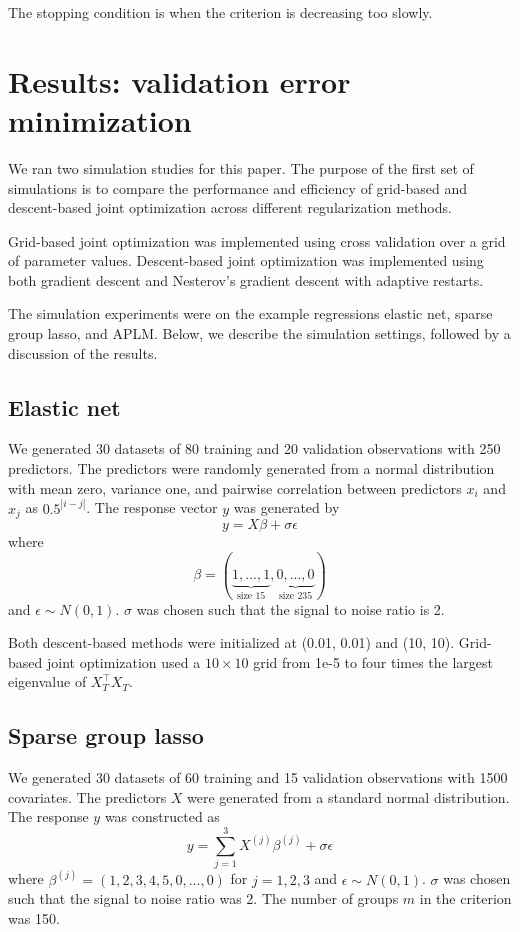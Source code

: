 \documentclass[10pt,letterpaper]{article}
\begin{document}
The stopping condition is when the criterion is decreasing too slowly.

\section{Results: validation error minimization}

We ran two simulation studies for this paper. The purpose of the first set of simulations is to compare the performance and efficiency of grid-based and descent-based joint optimization across different regularization methods.

Grid-based joint optimization was implemented using cross validation over a grid of parameter values. Descent-based joint optimization was implemented using both gradient descent and Nesterov's gradient descent with adaptive restarts.

The simulation experiments were on the example regressions elastic net, sparse group lasso, and APLM.  Below, we describe the simulation settings, followed by a discussion of the results.

\subsection{Elastic net}
We generated 30 datasets of 80 training and 20 validation observations with 250 predictors. The predictors were randomly generated from a normal distribution with mean zero, variance one, and pairwise correlation between predictors $x_i$ and $x_j$ as $0.5^{|i-j|}$.
The response vector $y$ was generated by
\begin{equation}
y = X\beta + \sigma \epsilon
\end{equation}
where
\begin{equation}
\beta = (\underbrace{1, ..., 1}_\text{size 15}, \underbrace{0, ..., 0}_\text{size 235})
\end{equation}
and $\epsilon \sim N(0, 1)$. $\sigma$ was chosen such that the signal to noise ratio is 2. 

Both descent-based methods were initialized at (0.01, 0.01) and (10, 10). Grid-based joint optimization used a $10 \times 10$ grid from 1e-5 to four times the largest eigenvalue of $X_T^\top X_T$.

\subsection{Sparse group lasso}

We generated 30 datasets of 60 training and 15 validation observations with 1500 covariates. The predictors $X$ were generated from a standard normal distribution. The response $y$ was constructed as
\begin{equation}
y = \sum\limits_{j=1}^3 X^{(j)} \beta^{(j)} + \sigma \epsilon
\end{equation}
where $\beta^{(j)} = (1, 2, 3, 4, 5, 0, ..., 0)$ for $j = 1, 2, 3$ and $\epsilon \sim N(0, 1)$. $\sigma$ was chosen such that the signal to noise ratio was 2. The number of groups $m$ in the criterion was 150.
\end{document}
